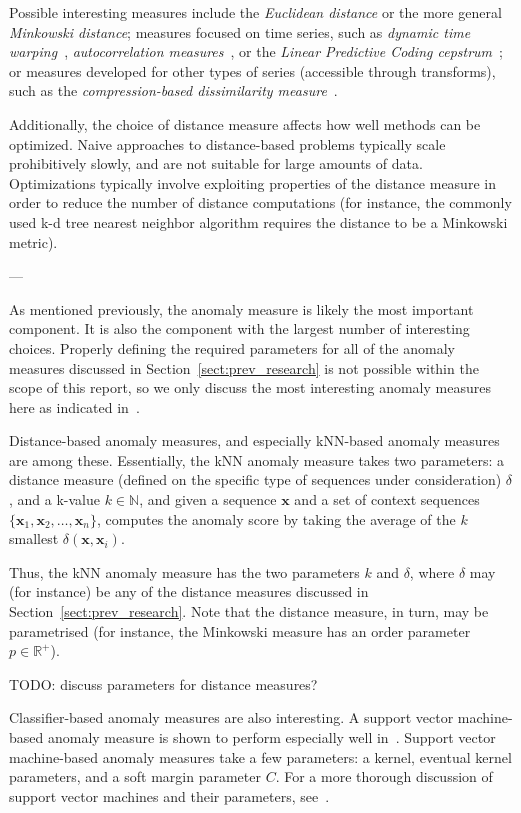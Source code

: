 Possible interesting measures include the \emph{Euclidean distance} or the more general \emph{Minkowski distance}; measures focused on time series, such as \emph{dynamic time warping}~\cite{dtw}, \emph{autocorrelation measures}~\cite{autocorrelation}, or the \emph{Linear Predictive Coding cepstrum}~\cite{cepstrum}; or measures developed for other types of series (accessible through transforms), such as the \emph{compression-based dissimilarity measure}~\cite{keogh2}.

Additionally, the choice of distance measure affects how well methods can be optimized. Naive approaches to distance-based problems typically scale prohibitively slowly, and are not suitable for large amounts of data. Optimizations typically involve exploiting properties of the distance measure in order to reduce the number of distance computations (for instance, the commonly used k-d tree nearest neighbor algorithm requires the distance to be a Minkowski metric).

---

As mentioned previously, the anomaly measure is likely the most important component. It is also the component with the largest number of interesting choices. Properly defining the required parameters for all of the anomaly measures discussed in Section~\ref{sect:prev_research} is not possible within the scope of this report, so we only discuss the most interesting anomaly measures here as indicated in~\cite{chandola3}.

Distance-based anomaly measures, and especially kNN-based anomaly measures are among these. Essentially, the kNN anomaly measure takes two parameters: a distance measure (defined on the specific type of sequences under consideration) $\delta$, and a k-value $k \in \mathbb{N}$, and given a sequence $\mathbf{x}$ and a set of context sequences $\{\mathbf{x}_1, \mathbf{x}_2, \dots, \mathbf{x}_n\}$, computes the anomaly score by taking the average of the $k$ smallest $\delta(\mathbf{x}, \mathbf{x}_i)$.

Thus, the kNN anomaly measure has the two parameters $k$ and $\delta$, where $\delta$ may (for instance) be any of the distance measures discussed in Section~\ref{sect:prev_research}. Note that the distance measure, in turn, may be parametrised (for instance, the Minkowski measure has an order parameter $p \in \mathbb{R}^+$).

TODO: discuss parameters for distance measures?

Classifier-based anomaly measures are also interesting. A support vector machine-based anomaly measure is shown to perform especially well in~\cite{chandola3}. Support vector machine-based anomaly measures take a few parameters: a kernel, eventual kernel parameters, and a soft margin parameter $C$. For a more thorough discussion of support vector machines and their parameters, see~\cite{TODO}.

